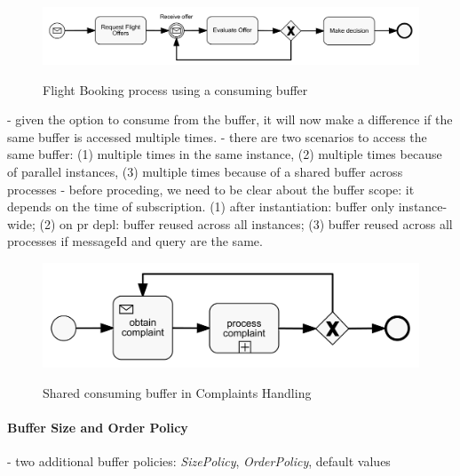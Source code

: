 

\begin{figure}[]
	\myfloatalign
	{\includegraphics[width=1\linewidth]{chapters/concept/bpmnx/FlightBooking.png}}
	\caption{Flight Booking process using a consuming buffer}\label{fig:example-flightbooking}
\end{figure}


- given the option to consume from the buffer, it will now make a difference if the same buffer is accessed multiple times.
- there are two scenarios to access the same buffer: (1) multiple times in the same instance, (2) multiple times because of parallel instances, (3) multiple times because of a shared buffer across processes
- before proceding, we need to be clear about the buffer scope: it depends on the time of subscription. (1) after instantiation: buffer only instance-wide; (2) on pr depl: buffer reused across all instances; (3) buffer reused across all processes if messageId and query are the same.

\begin{figure}[]
	\myfloatalign
	{\includegraphics[width=1\linewidth]{chapters/concept/bpmnx/ComplaintProcessing.png}}
	\caption{Shared consuming buffer in Complaints Handling}\label{fig:example-complaints}
\end{figure}

\paragraph{Buffer Size and Order Policy\newline}

- two additional buffer policies: \textit{SizePolicy}, \textit{OrderPolicy}, default values


